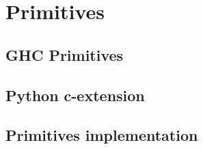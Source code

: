 

\chapter{Primitives}

\section{GHC Primitives}

\section{Python c-extension}

\section{Primitives implementation}

